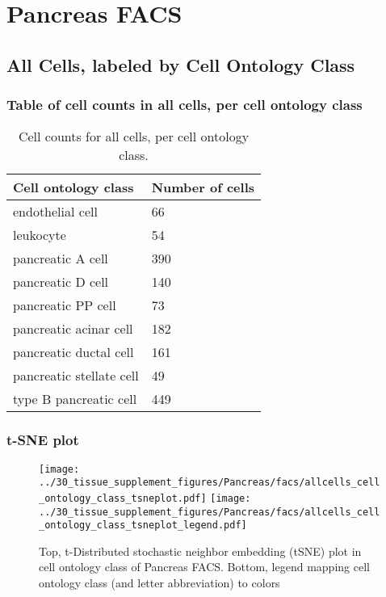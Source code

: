 \newpage
\section{Pancreas FACS}

\subsection{All Cells, labeled by Cell Ontology Class}
\subsubsection{Table of cell counts in all cells, per cell ontology class}\begin{table}[h]
\centering
\label{my-label}
\begin{tabular}{@{}ll@{}}
\toprule

Cell ontology class& Number of cells \\ \midrule
endothelial cell & 66 \\

leukocyte & 54 \\

pancreatic A cell & 390 \\

pancreatic D cell & 140 \\

pancreatic PP cell & 73 \\

pancreatic acinar cell & 182 \\

pancreatic ductal cell & 161 \\

pancreatic stellate cell & 49 \\

type B pancreatic cell & 449 \\
\bottomrule
\end{tabular}
\caption{Cell counts for all cells, per cell ontology class.}
\end{table}

\newpage
\subsubsection{t-SNE plot}
\begin{figure}[h]
\centering
\texttt{[image: ../30\_tissue\_supplement\_figures/Pancreas/facs/allcells\_cell\_ontology\_class\_tsneplot.pdf]}
\texttt{[image: ../30\_tissue\_supplement\_figures/Pancreas/facs/allcells\_cell\_ontology\_class\_tsneplot\_legend.pdf]}
\caption{Top, t-Distributed stochastic neighbor embedding (tSNE) plot  in cell ontology class of Pancreas FACS. Bottom, legend mapping cell ontology class (and letter abbreviation) to colors}
\end{figure}



